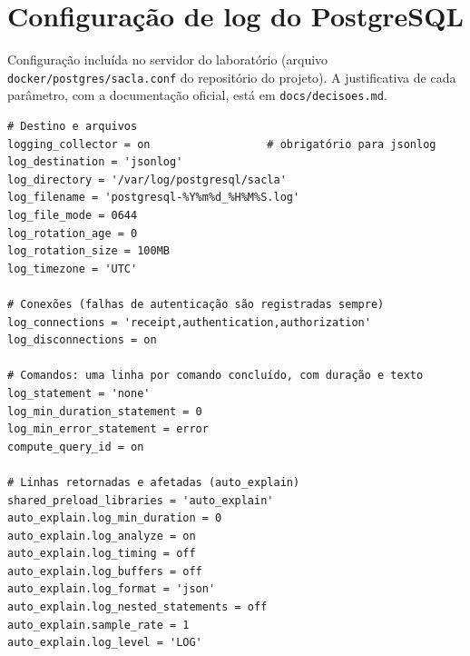 
\section{Configuração de log do PostgreSQL}
\label{apd:apendice-a}

Configuração incluída no servidor do laboratório (arquivo \nolinkurl{docker/postgres/sacla.conf} do
repositório do projeto). A justificativa de cada parâmetro, com a documentação oficial, está em
\nolinkurl{docs/decisoes.md}.

\begin{lstlisting}[numbers=none]
# Destino e arquivos
logging_collector = on                  # obrigatório para jsonlog
log_destination = 'jsonlog'
log_directory = '/var/log/postgresql/sacla'
log_filename = 'postgresql-%Y%m%d_%H%M%S.log'
log_file_mode = 0644
log_rotation_age = 0
log_rotation_size = 100MB
log_timezone = 'UTC'

# Conexões (falhas de autenticação são registradas sempre)
log_connections = 'receipt,authentication,authorization'
log_disconnections = on

# Comandos: uma linha por comando concluído, com duração e texto
log_statement = 'none'
log_min_duration_statement = 0
log_min_error_statement = error
compute_query_id = on

# Linhas retornadas e afetadas (auto_explain)
shared_preload_libraries = 'auto_explain'
auto_explain.log_min_duration = 0
auto_explain.log_analyze = on
auto_explain.log_timing = off
auto_explain.log_buffers = off
auto_explain.log_format = 'json'
auto_explain.log_nested_statements = off
auto_explain.sample_rate = 1
auto_explain.log_level = 'LOG'
\end{lstlisting}
